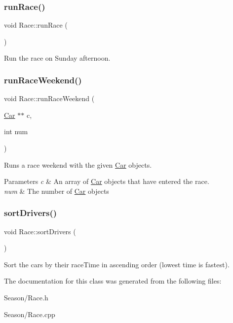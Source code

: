 \subsubsection{\texorpdfstring{run\+Race()}{runRace()}}
{\footnotesize\ttfamily void Race\+::run\+Race (\begin{DoxyParamCaption}{ }\end{DoxyParamCaption})\hspace{0.3cm}{\ttfamily [private]}}

Run the race on Sunday afternoon. \mbox{\label{classRace_a3ebb8fd22b1873fa3bb4d9df0bd839a3}} 
\subsubsection{\texorpdfstring{run\+Race\+Weekend()}{runRaceWeekend()}}
{\footnotesize\ttfamily void Race\+::run\+Race\+Weekend (\begin{DoxyParamCaption}\item[{\hyperlink{classCar}{Car} $\ast$$\ast$}]{c,  }\item[{int}]{num }\end{DoxyParamCaption})}

Runs a race weekend with the given \hyperlink{classCar}{Car} objects. 
\begin{DoxyParams}{Parameters}
{\em c} & An array of \hyperlink{classCar}{Car} objects that have entered the race. \\
\hline
{\em num} & The number of \hyperlink{classCar}{Car} objects \\
\hline
\end{DoxyParams}
\mbox{\label{classRace_a11e9a7fa89848e8dff07c4703f7bbdea}} 
\subsubsection{\texorpdfstring{sort\+Drivers()}{sortDrivers()}}
{\footnotesize\ttfamily void Race\+::sort\+Drivers (\begin{DoxyParamCaption}{ }\end{DoxyParamCaption})\hspace{0.3cm}{\ttfamily [private]}}

Sort the cars by their race\+Time in ascending order (lowest time is fastest). 

The documentation for this class was generated from the following files\+:\begin{DoxyCompactItemize}
\item 
Season/Race.\+h\item 
Season/Race.\+cpp\end{DoxyCompactItemize}
